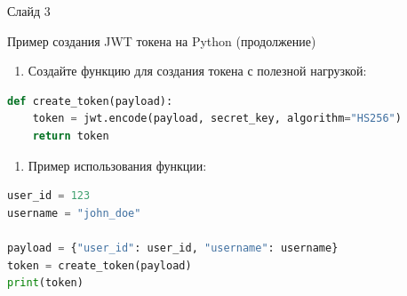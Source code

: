 \documentclass[
  ignorenonframetext,
  aspectratio=169,
  aspectratio=169]{beamer}
\providecommand{\tightlist}{%
  \setlength{\itemsep}{0pt}\setlength{\parskip}{0pt}}
\begin{document}
\begin{frame}[fragile]{Слайд 3}
\protect\hypertarget{ux441ux43bux430ux439ux434-3}{}
\begin{block}{Пример создания JWT токена на Python (продолжение)}
\protect\hypertarget{ux43fux440ux438ux43cux435ux440-ux441ux43eux437ux434ux430ux43dux438ux44f-jwt-ux442ux43eux43aux435ux43dux430-ux43dux430-python-ux43fux440ux43eux434ux43eux43bux436ux435ux43dux438ux435}{}
\begin{enumerate}
\tightlist
\item
  Создайте функцию для создания токена с полезной нагрузкой:
\end{enumerate}

\begin{lstlisting}[language=Python]
def create_token(payload):
    token = jwt.encode(payload, secret_key, algorithm="HS256")
    return token
\end{lstlisting}

\begin{enumerate}
\tightlist
\item
  Пример использования функции:
\end{enumerate}

\begin{lstlisting}[language=Python]
user_id = 123
username = "john_doe"

payload = {"user_id": user_id, "username": username}
token = create_token(payload)
print(token)
\end{lstlisting}
\end{block}
\end{frame}
\end{document}
